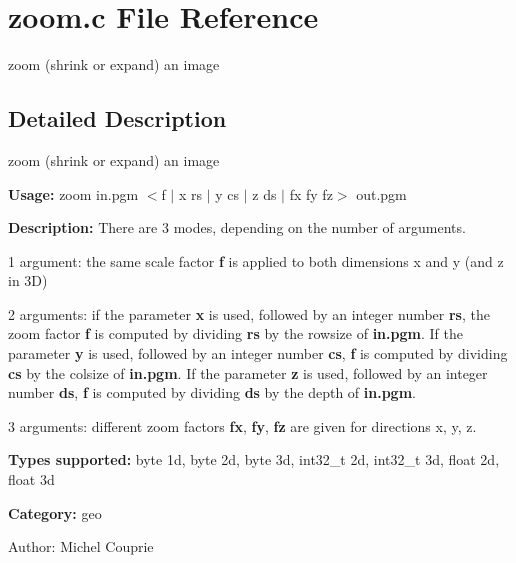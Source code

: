\section{zoom.c File Reference}
\label{zoom_8c}
zoom (shrink or expand) an image 



\subsection{Detailed Description}
zoom (shrink or expand) an image 

{\bf Usage:} zoom in.pgm $<$f $|$ x rs $|$ y cs $|$ z ds $|$ fx fy fz$>$ out.pgm

{\bf Description:} There are 3 modes, depending on the number of arguments.

1 argument: the same scale factor {\bf f} is applied to both dimensions x and y (and z in 3D)

2 arguments: if the parameter {\bf x} is used, followed by an integer number {\bf rs}, the zoom factor {\bf f} is computed by dividing {\bf rs} by the rowsize of {\bf in.pgm}. If the parameter {\bf y} is used, followed by an integer number {\bf cs}, {\bf f} is computed by dividing {\bf cs} by the colsize of {\bf in.pgm}. If the parameter {\bf z} is used, followed by an integer number {\bf ds}, {\bf f} is computed by dividing {\bf ds} by the depth of {\bf in.pgm}.

3 arguments: different zoom factors {\bf fx}, {\bf fy}, {\bf fz} are given for directions x, y, z.

{\bf Types supported:} byte 1d, byte 2d, byte 3d, int32\_\-t 2d, int32\_\-t 3d, float 2d, float 3d

{\bf Category:} geo

\begin{Desc}
\item[Author:]Michel Couprie \end{Desc}
